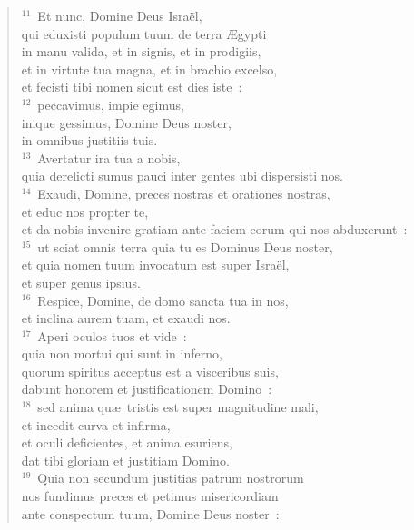 \begin{flushleft}\begin{verse}${}^{11}$~Et nunc, Domine Deus Isra\"el,\\ qui eduxisti populum tuum de terra \AE gypti\\ in manu valida, et in signis, et in prodigiis,\\ et in virtute tua magna, et in brachio excelso,\\ et fecisti tibi nomen sicut est dies iste~:\\
${}^{12}$~peccavimus, impie egimus,\\ inique gessimus, Domine Deus noster,\\ in omnibus justitiis tuis.\\
${}^{13}$~Avertatur ira tua a nobis,\\ quia derelicti sumus pauci inter gentes ubi dispersisti nos.\\
${}^{14}$~Exaudi, Domine, preces nostras et orationes nostras,\\ et educ nos propter te,\\ et da nobis invenire gratiam ante faciem eorum qui nos abduxerunt~:\\
${}^{15}$~ut sciat omnis terra quia tu es Dominus Deus noster,\\ et quia nomen tuum invocatum est super Isra\"el,\\ et super genus ipsius.\\
${}^{16}$~Respice, Domine, de domo sancta tua in nos,\\ et inclina aurem tuam, et exaudi nos.\\
${}^{17}$~Aperi oculos tuos et vide~:\\ quia non mortui qui sunt in inferno,\\ quorum spiritus acceptus est a visceribus suis,\\ dabunt honorem et justificationem Domino~:\\
${}^{18}$~sed anima qu\ae\ tristis est super magnitudine mali,\\ et incedit curva et infirma,\\ et oculi deficientes, et anima esuriens,\\ dat tibi gloriam et justitiam Domino.\\
${}^{19}$~Quia non secundum justitias patrum nostrorum\\ nos fundimus preces et petimus misericordiam\\ ante conspectum tuum, Domine Deus noster~:\\

\end{verse}
\end{flushleft}
